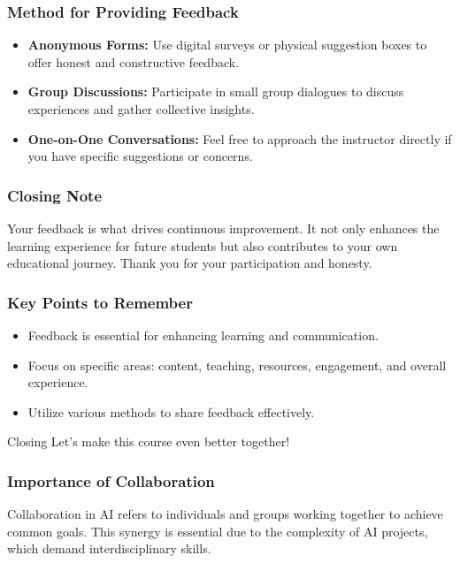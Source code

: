 \documentclass[aspectratio=169]{beamer}
\begin{document}
\begin{frame}[fragile]
    \frametitle{Method for Providing Feedback}
    \begin{itemize}
        \item \textbf{Anonymous Forms:} Use digital surveys or physical suggestion boxes to offer honest and constructive feedback.
        \item \textbf{Group Discussions:} Participate in small group dialogues to discuss experiences and gather collective insights.
        \item \textbf{One-on-One Conversations:} Feel free to approach the instructor directly if you have specific suggestions or concerns.
    \end{itemize}
\end{frame}

\begin{frame}[fragile]
    \frametitle{Closing Note}
    Your feedback is what drives continuous improvement. It not only enhances the learning experience for future students but also contributes to your own educational journey. Thank you for your participation and honesty.
\end{frame}

\begin{frame}[fragile]
    \frametitle{Key Points to Remember}
    \begin{itemize}
        \item Feedback is essential for enhancing learning and communication.
        \item Focus on specific areas: content, teaching, resources, engagement, and overall experience.
        \item Utilize various methods to share feedback effectively.
    \end{itemize}
    \begin{block}{Closing}
        Let’s make this course even better together!
    \end{block}
\end{frame}

\begin{frame}[fragile]
    \frametitle{Importance of Collaboration}
    Collaboration in AI refers to individuals and groups working together to achieve common goals. This synergy is essential due to the complexity of AI projects, which demand interdisciplinary skills.
\end{frame}
\end{document}
